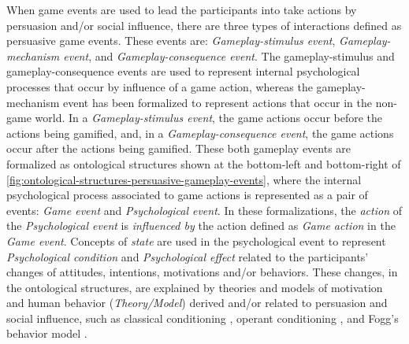 When game events are used to lead the participants into take actions by persuasion and/or social influence, there are three types of interactions defined as persuasive game events. These events are: \emph{Gameplay-stimulus event}, \emph{Gameplay-mechanism event}, and \emph{Gameplay-consequence event}. The gameplay-stimulus and gameplay-consequence events are used to represent internal psychological processes that occur by influence of a game action, whereas the gameplay-mechanism event has been formalized to represent actions that occur in the non-game world. In a \emph{Gameplay-stimulus event}, the game actions occur before the actions being gamified, and, in a \emph{Gameplay-consequence event}, the game actions occur after the actions being gamified. These both gameplay events are formalized as ontological structures shown at the bottom-left and bottom-right of \autoref{fig:ontological-structures-persuasive-gameplay-events}, where the internal psychological process associated to game actions is represented as a pair of events: \emph{Game event} and \emph{Psychological event}.
In these formalizations, the \emph{action} of the \emph{Psychological event} is \emph{influenced by} the action defined as \emph{Game action} in the \emph{Game event}. Concepts of \emph{state} are used in the psychological event to represent \emph{Psychological condition} and \emph{Psychological effect} related to the participants' changes of attitudes, intentions, motivations and/or behaviors. These changes, in the ontological structures, are explained by theories and models of motivation and human behavior (\emph{Theory/Model}) derived and/or related to persuasion and social influence, such as classical conditioning \cite{GormezanoProkasyThompsonThompson1987}, operant conditioning \cite{Skinner1953}, and Fogg's behavior model \cite{Fogg2009}.

